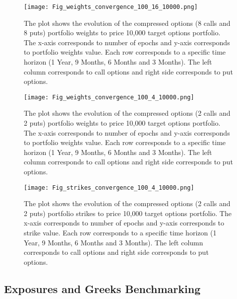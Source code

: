 \begin{figure}[!htb]
\begin{center}
\texttt{[image: Fig\_weights\_convergence\_100\_16\_10000.png]}
\caption{The plot shows the evolution of the compressed options (8 calls and 8 puts) portfolio weights to price 10,000 target options portfolio. The x-axis corresponds to number of epochs and y-axis corresponds to portfolio weights value. Each row corresponds to a specific time horizon (1 Year, 9 Months, 6 Months and 3 Months). The left column corresponds to call options and right side corresponds to put options.} \label{Fig_weights_convergence_100_16_10000.png}
\end{center}
\end{figure}

\begin{figure}[!htb]
\begin{center}
\texttt{[image: Fig\_weights\_convergence\_100\_4\_10000.png]}
\caption{The plot shows the evolution of the compressed options (2 calls and 2 puts) portfolio weights to price 10,000 target options portfolio. The x-axis corresponds to number of epochs and y-axis corresponds to portfolio weights value. Each row corresponds to a specific time horizon (1 Year, 9 Months, 6 Months and 3 Months). The left column corresponds to call options and right side corresponds to put options.} \label{Fig_weights_convergence_100_4_10000.png}
\end{center}
\end{figure}



\begin{figure}[!htb]
\begin{center}
\texttt{[image: Fig\_strikes\_convergence\_100\_4\_10000.png]}
\caption{The plot shows the evolution of the compressed options (2 calls and 2 puts) portfolio strikes to price 10,000 target options portfolio. The x-axis corresponds to number of epochs and y-axis corresponds to strike value. Each row corresponds to a specific time horizon (1 Year, 9 Months, 6 Months and 3 Months). The left column corresponds to call options and right side corresponds to put options.} 
\label{Fig_strikes_convergence_100_4_10000.png}
\end{center}
\end{figure}


\clearpage
\subsection{Exposures and Greeks Benchmarking}
\label{exposure_bench}

